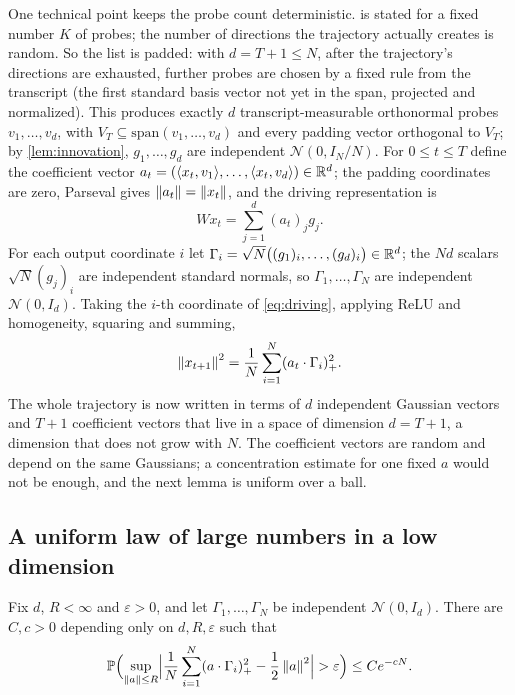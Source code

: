 One technical point keeps the probe count deterministic.  is stated for a fixed number $K$ of probes; the number of directions the trajectory actually creates is random. So the list is padded: with $d=T+1\le N$, after the trajectory's directions are exhausted, further probes are chosen by a fixed rule from the transcript (the first standard basis vector not yet in the span, projected and normalized). This produces exactly $d$ transcript-measurable orthonormal probes $v_1,\dots,v_d$, with $V_T\subseteq\mathrm{span}(v_1,\dots,v_d)$ and every padding vector orthogonal to $V_T$; by \cref{lem:innovation}, $g_1,\dots,g_d$ are independent $\mathcal N(0,I_N/N)$. For $0\le t\le T$ define the coefficient vector $a_t=(\langle x_t,v_1\rangle,\dots,\langle x_t,v_d\rangle)\in\mathbb{R}^d$; the padding coordinates are zero, Parseval gives $\left\lVert a_t\right\rVert=\left\lVert x_t\right\rVert$, and the driving representation is
\begin{equation}\label{eq:driving}
Wx_t=\sum_{j=1}^d(a_t)_jg_j .
\end{equation}
For each output coordinate $i$ let $\Gamma_i=\sqrt N\bigl((g_1)_i,\dots,(g_d)_i\bigr)\in\mathbb{R}^d$; the $Nd$ scalars $\sqrt N(g_j)_i$ are independent standard normals, so $\Gamma_1,\dots,\Gamma_N$ are independent $\mathcal N(0,I_d)$. Taking the $i$-th coordinate of \cref{eq:driving}, applying ReLU and homogeneity, squaring and summing,
\begin{equation}\label{eq:onestep}
\left\lVert x_{t+1}\right\rVert^2=\frac1N\sum_{i=1}^N(a_t\cdot\Gamma_i)_+^2 .
\end{equation}
The whole trajectory is now written in terms of $d$ independent Gaussian vectors and $T+1$ coefficient vectors that live in a space of dimension $d=T+1$, a dimension that does not grow with $N$. The coefficient vectors are random and depend on the same Gaussians; a concentration estimate for one fixed $a$ would not be enough, and the next lemma is uniform over a ball.

\subsection{A uniform law of large numbers in a low dimension}

\begin{lemma}\label{lem:ulln}
Fix $d$, $R<\infty$ and $\varepsilon>0$, and let $\Gamma_1,\dots,\Gamma_N$ be independent $\mathcal N(0,I_d)$. There are $C,c>0$ depending only on $d,R,\varepsilon$ such that
\[
\PP\Bigl(\sup_{\norm a\le R}\Bigl|\frac1N\sum_{i=1}^N(a\cdot\Gamma_i)_+^2-\frac12\norm a^2\Bigr|>\varepsilon\Bigr)\le Ce^{-cN}.
\]
\end{lemma}

